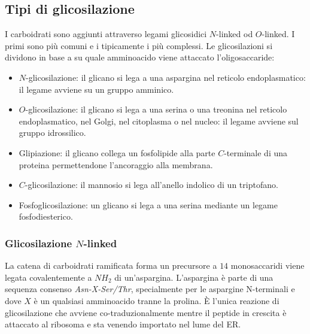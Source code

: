 	\subsection{Tipi di glicosilazione}
	I carboidrati sono aggiunti attraverso legami glicosidici $N$-linked od $O$-linked.
	I primi sono pi\`u comuni e i tipicamente i pi\`u complessi.
	Le glicosilazioni si dividono in base a su quale amminoacido viene attaccato l'oligosaccaride:
	\begin{itemize}
		\item $N$-glicosilazione: il glicano si lega a una aspargina nel reticolo endoplasmatico: il legame avviene su un gruppo amminico.
		\item $O$-glicosilazione: il glicano si lega a una serina o una treonina nel reticolo endoplasmatico, nel Golgi, nel citoplasma o nel nucleo: il legame avviene sul gruppo idrossilico.
		\item Glipiazione: il glicano collega un fosfolipide alla parte $C$-terminale di una proteina permettendone l'ancoraggio alla membrana.
		\item $C$-glicosilazione: il mannosio si lega all'anello indolico di un triptofano.
		\item Fosfoglicosilazione: un glicano si lega a una serina mediante un legame fosfodiesterico.
	\end{itemize}

		\subsubsection{Glicosilazione $N$-linked}
		La catena di carboidrati ramificata forma un precursore a $14$ monosaccaridi viene legata covalentemente a \emph{$NH_2$} di un'aspargina.
		L'aspargina \`e parte di una sequenza consenso \emph{Asn-X-Ser/Thr}, specialmente per le aspargine N-terminali e dove $X$ \`e un qualsiasi amminoacido tranne la prolina.
		\`E l'unica reazione di glicosilazione che avviene co-traduzionalmente mentre il peptide in crescita \`e attaccato al ribosoma e sta venendo importato nel lume del ER.
			
